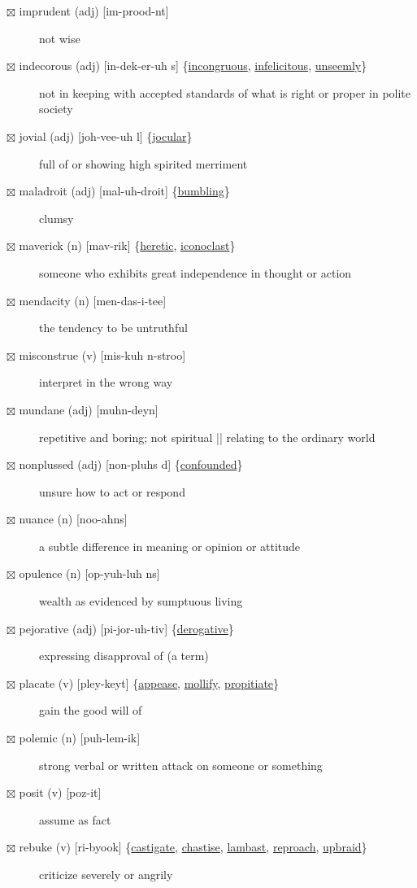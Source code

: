 \documentclass[11pt]{article}
\begin{document}
\begin{description}
\item[{$\boxtimes$ imprudent (adj) [im-prood-nt]}] not wise
\item[{$\boxtimes$ \label{org6f6aa07}indecorous (adj) [in-dek-er-uh s] \{\hyperref[org42977a6]{incongruous}, \hyperref[org04e38e0]{infelicitous}, \hyperref[org5b5b913]{unseemly}\}}] not in keeping with accepted standards of what is right or proper in polite society
\item[{$\boxtimes$ \label{orgc169544}jovial (adj) [joh-vee-uh l] \{\hyperref[org894210d]{jocular}\}}] full of or showing high spirited merriment
\item[{$\boxtimes$ \label{orga8f4f1d}maladroit (adj) [mal-uh-droit] \{\hyperref[org0a6663a]{bumbling}\}}] clumsy
\item[{$\boxtimes$ \label{org15e752e}maverick (n) [mav-rik] \{\hyperref[orgfb725fd]{heretic}, \hyperref[org55ebaaa]{iconoclast}\}}] someone who exhibits great independence in thought or action
\item[{$\boxtimes$ mendacity (n) [men-das-i-tee]}] the tendency to be untruthful
\item[{$\boxtimes$ misconstrue (v) [mis-kuh n-stroo]}] interpret in the wrong way
\item[{$\boxtimes$ mundane (adj) [muhn-deyn]}] repetitive and boring; not spiritual || relating to the ordinary world
\item[{$\boxtimes$ nonplussed (adj) [non-pluhs d] \{\hyperref[orga32dfdd]{confounded}\}}] unsure how to act or respond
\item[{$\boxtimes$ nuance (n) [noo-ahns]}] a subtle difference in meaning or opinion or attitude
\item[{$\boxtimes$ opulence (n) [op-yuh-luh ns]}] wealth as evidenced by sumptuous living
\item[{$\boxtimes$ pejorative (adj) [pi-jor-uh-tiv] \{\hyperref[orgbf4ee8a]{derogative}\}}] expressing disapproval of (a term)
\item[{$\boxtimes$ \label{orgdd5cad8}placate (v) [pley-keyt] \{\hyperref[orgd8f6dca]{appease}, \hyperref[org3a878a4]{mollify}, \hyperref[org1023dff]{propitiate}\}}] gain the good will of
\item[{$\boxtimes$ polemic (n) [puh-lem-ik]}] strong verbal or written attack on someone or something
\item[{$\boxtimes$ posit (v) [poz-it]}] assume as fact
\item[{$\boxtimes$ \label{org05472f9}rebuke (v) [ri-byook] \{\hyperref[org41ed9c5]{castigate}, \hyperref[org578f0de]{chastise}, \hyperref[orgcb82180]{lambast}, \hyperref[org3cb95b6]{reproach}, \hyperref[org6b90e9e]{upbraid}\}}] criticize severely or angrily

\end{description}
\end{document}
